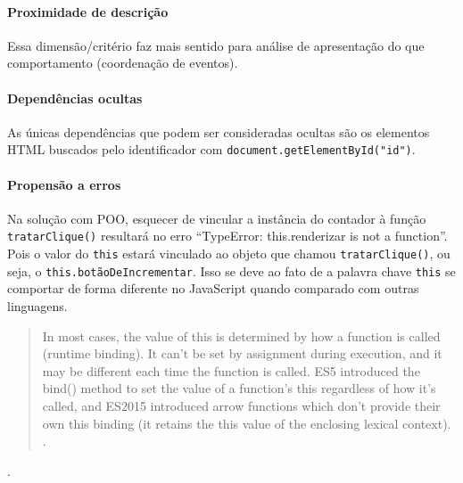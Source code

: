 \paragraph{Proximidade de descrição}
\label{sec:orga7cb9f9}
Essa dimensão/critério faz mais sentido para análise de apresentação do que
comportamento (coordenação de eventos).
\paragraph{Dependências ocultas}
\label{sec:orgcbbd9d8}
As únicas dependências que podem ser consideradas ocultas são os elementos
HTML buscados pelo identificador com \texttt{document.getElementById("id")}.
\paragraph{Propensão a erros}
\label{sec:orgd0b96d3}
Na solução com POO, esquecer de vincular a instância do contador à função
\texttt{tratarClique()} resultará no erro “TypeError: this.renderizar is not a
function”.
Pois o valor do \texttt{this} estará vinculado ao objeto que chamou
\texttt{tratarClique()}, ou seja, o \texttt{this.botãoDeIncrementar}.
Isso se deve ao fato de a palavra chave \texttt{this} se comportar de forma
diferente no JavaScript quando comparado com outras linguagens.

\begin{quote}
In most cases, the value of this is determined by how a function is called
(runtime binding). It can't be set by assignment during execution, and it
may be different each time the function is called. ES5 introduced the
bind() method to set the value of a function's this regardless of how it's
called, and ES2015 introduced arrow functions which don't provide their own
this binding (it retains the this value of the enclosing lexical context).
\cite{This2020}.
\end{quote}

.

